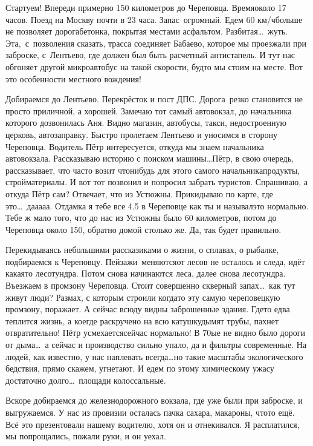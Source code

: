 Стартуем! Впереди примерно 150 километров до Череповца. Время\mdash около 17 часов. Поезд на Москву почти в 23 часа. Запас~огромный. Едем 60 км/ч\mdash больше не позволяет дорога\mdash бетонка, покрытая местами асфальтом. Разбитая\ldots~жуть. Эта,~с~позволения сказать, трасса соединяет Бабаево, которое мы проезжали при заброске, с~Лентьево, где должен был быть расчетный антистапель. И тут нас обгоняет другой микроавтобус на такой скорости, будто мы стоим на месте. Вот это особенности местного вождения! 

Добираемся до Лентьево. Перекрёсток и пост ДПС. Дорога~резко становится не просто приличной, а хорошей. Замечаю тот самый автовокзал, до начальника которого дозвонилась Аня. Видно магазин, автобусы, такси, недостроенную церковь, автозаправку. Быстро пролетаем Лентьево и уносимся в сторону Череповца. Водитель Пётр интересуется, откуда мы знаем начальника автовокзала. Рассказываю историю с поиском машины\ldots Пётр, в свою очередь, рассказывает, что часто возит что\sdash нибудь для этого самого начальника\mdash продукты, стройматериалы. И вот тот позвонил и попросил забрать туристов. Спрашиваю, а откуда Пётр сам? Отвечает, что из Устюжны. Прикидываю по карте, где это\ldots~да\sdash а\sdash а\sdash а\sdash а. Отдам\sdash ка я тебе все 4.5 в Череповце как ты и называл\mdash это нормально. Тебе ж мало того, что до нас из Устюжны было 60 километров, потом до Череповца около 150, обратно домой столько же. Да, так будет правильно. 

Перекидываясь небольшими рассказиками о жизни, о сплавах, о рыбалке, подбираемся к Череповцу. Пейзажи~меняются\mdash от лесов не осталось и следа, идёт какая\sdash то лесотундра. Потом снова начинаются леса, далее снова лесотундра. Въезжаем в промзону Череповца. Стоит совершенно скверный запах\ldots~как тут живут люди? Размах, с которым строили когда\sdash то эту самую череповецкую промзону, поражает. А сейчас всюду видны заброшенные здания. Где\sdash то едва теплится жизнь, а кое\sdash где раскручено на всю катушку\mdash дымят трубы, пахнет отвратительно! Пётр усмехается\mdash сейчас нормально! В 70\sdash ые не видно было дороги от дыма\ldots~а сейчас и производство сильно упало, да и фильтры современные. На людей, как известно, у нас наплевать всегда\ldots но такие масштабы экологического бедствия, прямо скажем, угнетают. И едем по этому химическому ужасу достаточно долго\ldots~площади колоссальные.

Вскоре добираемся до железнодорожного вокзала, где уже были при заброске, и выгружаемся. У нас из провизии осталась пачка сахара, макароны, что\sdash то ещё. Всё это презентовали нашему водителю, хотя он и отнекивался. Я расплатился, мы попрощались, пожали руки, и он уехал. 

